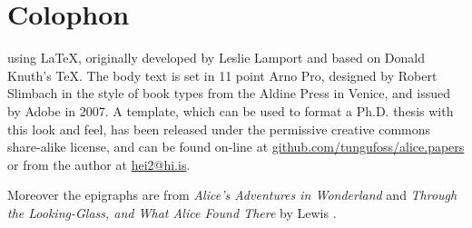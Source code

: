 \chapter*{Colophon}
\pagestyle{empty}
\thispagestyle{empty}
\begin{center}
	\parbox{200pt}{\raggedright {} using 
	\LaTeX, originally developed by Leslie Lamport and based on Donald Knuth's 
	\TeX. The body text is set in 11 point Arno Pro, designed by Robert 
	Slimbach in the style of book types from the Aldine Press in Venice, and 
	issued by Adobe in 2007. A template, which can be used to format a Ph.D. 
	thesis with this look and feel, has been released under the permissive 
	creative commons share-alike license, and can be found on-line at 
	\href{https://github.com/tungufoss/alice.papers/Thesis}{github.com/tungufoss/alice.papers}
	 or from the author at \href{mailto:hei2@hi.is}{hei2@hi.is}. 
	
    Moreover the epigraphs are from \emph{Alice's Adventures in Wonderland} 
    \citeyearpar{alice} and \emph{Through the Looking-Glass, and What Alice 
    Found There} \citeyearpar{lookingglass} by Lewis \citeauthor{alice}.}
\end{center}